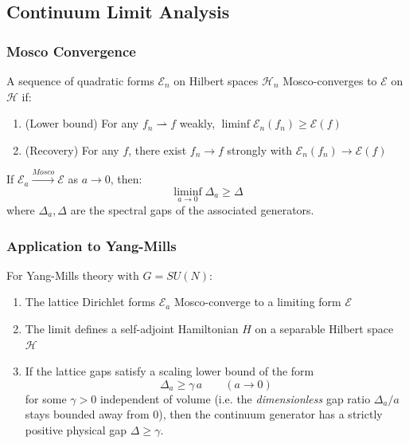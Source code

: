 \subsection{Continuum Limit Analysis}

\subsubsection{Mosco Convergence}

\begin{definition}
A sequence of quadratic forms $\mathcal{E}_n$ on Hilbert spaces $\mathcal{H}_n$ Mosco-converges to $\mathcal{E}$ on $\mathcal{H}$ if:
\begin{enumerate}
    \item (Lower bound) For any $f_n \rightharpoonup f$ weakly, $\liminf \mathcal{E}_n(f_n) \geq \mathcal{E}(f)$
    \item (Recovery) For any $f$, there exist $f_n \to f$ strongly with $\mathcal{E}_n(f_n) \to \mathcal{E}(f)$
\end{enumerate}
\end{definition}

\begin{theorem}\label{thm:mosco-spectral-hard}
If $\mathcal{E}_a \xrightarrow{Mosco} \mathcal{E}$ as $a \to 0$, then:
\begin{equation}
    \liminf_{a \to 0} \Delta_a \ge \Delta
\end{equation}
where $\Delta_a, \Delta$ are the spectral gaps of the associated generators.
\end{theorem}

\subsubsection{Application to Yang-Mills}

\begin{theorem}\label{thm:continuum-existence-hard}
For Yang-Mills theory with $G = SU(N)$:
\begin{enumerate}
    \item The lattice Dirichlet forms $\mathcal{E}_a$ Mosco-converge to a limiting form $\mathcal{E}$
    \item The limit defines a self-adjoint Hamiltonian $H$ on a separable Hilbert space $\mathcal{H}$
    \item If the lattice gaps satisfy a scaling lower bound of the form
    \begin{equation}
        \Delta_a \ge \gamma\, a \qquad (a \to 0)
    \end{equation}
    for some $\gamma>0$ independent of volume (i.e. the \emph{dimensionless} gap ratio $\Delta_a/a$ stays bounded away from $0$), then the continuum generator has a strictly positive physical gap $\Delta \ge \gamma$.
\end{enumerate}
\end{theorem}


